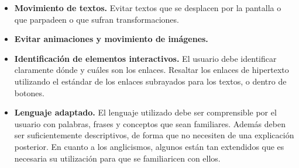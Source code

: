 \documentclass[a4paper,oneside,11pt]{book}
\begin{document}
\begin{itemize}
			\item \textbf{Movimiento de textos.} Evitar textos que se desplacen por la pantalla o que parpadeen o que sufran transformaciones.
			\item \textbf{Evitar animaciones y movimiento de imágenes.}
			\item \textbf{Identificación de elementos interactivos.} El usuario debe identificar claramente dónde y cuáles son los enlaces. Resaltar los enlaces de hipertexto utilizando el estándar de los enlaces subrayados para los textos, o dentro de botones.
			\item \textbf{Lenguaje adaptado.} El lenguaje utilizado debe ser comprensible por el usuario con palabras, frases y conceptos que sean familiares. Además deben ser suficientemente descriptivos, de forma que no necesiten de una explicación posterior. En cuanto a los anglicismos, algunos están tan extendidos que es necesaria su utilización para que se familiaricen con ellos.			
		\end{itemize}
	
	
	
	
	
	
	
\end{document}
